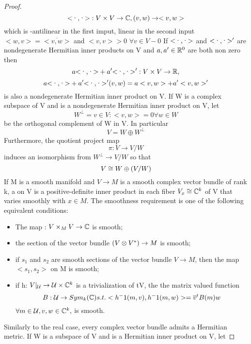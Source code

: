 \begin{proof}
$$\scal: V \times V \to \Cbb, (v,w) \to <v,w>$$
which is \Cbb-antilinear in the first imput, \Cbb linear in the second input  $<w,v> = \overline{<v,w>}$ and $<v,v>\gt 0$ $\forall v\in V - 0$
If $\scal$ and $\scal '$ are nondegenerate Hermitian inner products on V and $a,a' \in \mathbb{R}^{0}$ are both non zero then
$$a \scal + a'\scal ': V \times V \to \Rbb,$$ $$ {a\scal +a'\scal'(v,w) = a <v,w> +a'<v,w>'}$$
is also a nondegenerate Hermitian inner product on V.
 If W is a complex subspace of V and \scal is a nondegenerate Hermitian inner product on V, let 
\begin{equation*}
 W^{\perp} = {v \in V: <v,w> = 0 \forall w \in W}
\end{equation*}
be the orthogonal complement of W in V. In particular 
\begin{equation*}
 V = W \oplus W^{\perp}
\end{equation*}
Furthermore, the quotient project map 
\begin{equation*}
 \pi: V \to V/W
\end{equation*}
induces an isomorphism from $W^\perp \to V/W$ so that 
\begin{equation*}
 V \cong W \oplus (V/W)
\end{equation*}
If M is a smooth manifold and $V \to M$ is a smooth complex vector bundle of rank k, a  on V is a 
positive-definite inner product in each fiber 
$V_x \cong \mathbb{C}^k$ of V that varies smoothly with $x \in M$.
    The smoothness requirement is one of the following equivalent conditions:
\begin{itemize}
 \item The map \scal: $V \times_{M} V \to \mathbb{C}$ is smooth;
\item the section \scal of the vector bundle $(V \otimes V^{*})\to M$ is smooth;
\item if $s_1$ and $s_2$ are smooth sections of the vector bundle $V \to M$, then the map
$<s_1,s_2>$ on M is smooth;
\item if h: $V|_{\mathcal{U}}\to \mathcal{U} \times \mathbb{C}^k$ is a trivialization of tV, the the matrix valued function
\begin{equation*}
 B: \mathcal{U} \to Sym_{k}(\mathbb{C}) s.t. <h^-1(m,v),h^-1(m,w)> = \overline{v}^t B(m) w 
\end{equation*}
$\forall m \in \mathcal{U}, v,w \in \mathbb{C}^k,$ is smooth.
\end{itemize}
Similarly to the real case, every complex vector bundle admits a Hermitian metric. 
 If W is a subspace of V and \scal is a Hermitian inner product on V, let 

\end{proof}
